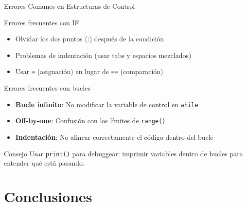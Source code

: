 \documentclass[10pt]{beamer}
\begin{document}
\begin{frame}{Errores Comunes en Estructuras de Control}
  \begin{block}{Errores frecuentes con IF}
    \begin{itemize}
      \item Olvidar los dos puntos (:) después de la condición
      \item Problemas de indentación (usar tabs y espacios mezclados)
      \item Usar \texttt{=} (asignación) en lugar de \texttt{==} (comparación)
    \end{itemize}
  \end{block}
  
  \begin{block}{Errores frecuentes con bucles}
    \begin{itemize}
      \item \textbf{Bucle infinito}: No modificar la variable de control en \texttt{while}
      \item \textbf{Off-by-one}: Confusión con los límites de \texttt{range()}
      \item \textbf{Indentación}: No alinear correctamente el código dentro del bucle
    \end{itemize}
  \end{block}
  
  \begin{alertblock}{Consejo}
    Usar \texttt{print()} para debuggear: imprimir variables dentro de bucles para entender qué está pasando.
  \end{alertblock}
\end{frame}

\section{Conclusiones}
\end{document}
